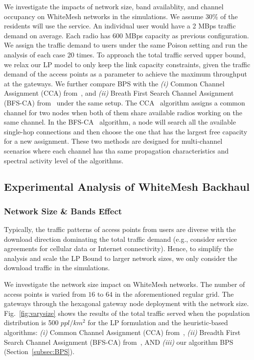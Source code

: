 We investigate the impacts of network size, band availablity, and channel occupancy on WhiteMesh networks 
in the simulations.
We assume 30\% of the residents will use the service. An individual user would have a 2 MBps 
traffic demand on average. Each radio has 600 MBps capacity as previous configuration.
We assign the traffic demand to users under the same Poison setting and 
run the analysis of each case 20 times. To approach the total traffic served upper bound, we relax our LP 
model to only keep the link capacity constraints, given the traffic demand of the access points as a 
parameter to achieve the maximum throughput at the gateways. We further compare BPS with the 
{\it (i)} Common Channel Assignment (CCA) from~\cite{draves2004routing},
and {\it (ii)} Breath First Search Channel Assignment (BFS-CA) from~\cite{tang2005interference}
under the same setup.
The CCA~\cite{draves2004routing} algorithm assigns a common channel for two nodes when both of them 
share available radios working on the same channel. In the BFS-CA~\cite{tang2005interference} algorithm, 
a node will search all the available single-hop connections and then choose the one that has the largest 
free capacity for a new assignment. 
These two methods are designed for multi-channel scenarios 
where each channel has tha same propagation characteristics and spectral activity 
level of the algorithms.



\subsection{Experimental Analysis of WhiteMesh Backhaul}
\label{subsec:wmanalysis}

\subsubsection{Network Size \& Bands Effect}

Typically, the traffic patterns of access points from users are diverse with
the download direction dominating the total traffic demand (e.g., consider
service agreements for cellular data or Internet connectivity). 
Hence, to simplify the analysis and scale the LP Bound to larger network 
sizes, we only consider the download traffic in the simulations.

We investigate the network size impact on WhiteMesh networks. 
The number of access points is varied from $16$ to $64$ in the aforementioned 
regular grid. 
The gateways through the hexagonal gateway node deployment with the network 
size.
Fig.~\ref{fig:varysize} shows the results of the total traffic served 
when the population distribution is 500 $ppl/km^2$ 
for the LP formulation and the heuristic-based algorithms: 
{\it (i)} Common Channel Assignment (CCA) from~\cite{draves2004routing},
{\it (ii)} Breadth First Search Channel Assignment (BFS-CA) from~\cite{ramachandran2006interference},
AND {\it (iii)} our algorithm BPS (Section~\ref{subsec:BPS}).


